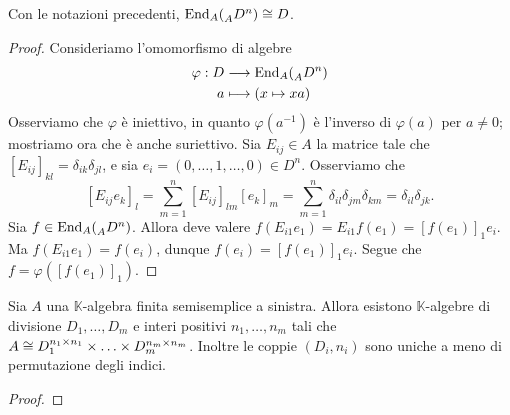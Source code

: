 \begin{proposition}
Con le notazioni precedenti, $\operatorname{End}_A(\prescript{}{A}{D}^n)\cong D$.
\end{proposition}
\begin{proof}
Consideriamo l'omomorfismo di algebre
\begin{align*}
\varphi:D&\longrightarrow\operatorname{End}_A(\prescript{}{A}{D}^n)\\
a&\longmapsto(x\mapsto xa)
\end{align*}
Osserviamo che $\varphi$ è iniettivo, in quanto $\varphi(a^{-1})$ è l'inverso di $\varphi(a)$ per $a\neq 0$; mostriamo ora che è anche suriettivo. Sia $E_{ij}\in A$ la matrice tale che $[E_{ij}]_{kl}=\delta_{ik}\delta_{jl}$, e sia $e_i=(0,\ldots,1,\ldots,0)\in D^n$. Osserviamo che
$$
[E_{ij}e_k]_l=\sum_{m=1}^{n}[E_{ij}]_{lm}[e_k]_m=\sum_{m=1}^{n}\delta_{il}\delta_{jm}\delta_{km}=\delta_{il}\delta_{jk}.
$$
Sia $f\in\operatorname{End}_A(\prescript{}{A}{D}^n)$. Allora deve valere $f(E_{i1}e_1)=E_{i1}f(e_1)=[f(e_1)]_1e_i$. Ma $f(E_{i1}e_1)=f(e_i)$, dunque $f(e_i)=[f(e_1)]_1e_i$. Segue che $f=\varphi([f(e_1)]_1)$.
\end{proof}


\begin{proposition}
Sia $A$ una $\mathbb{K}$-algebra finita semisemplice a sinistra. Allora esistono $\mathbb{K}$-algebre di divisione $D_1,\ldots,D_m$ e interi positivi $n_1,\ldots, n_m$ tali che $A\cong D_1^{n_1\times n_1}\times\ldots\times D_m^{n_m\times n_m}$. Inoltre le coppie $(D_i,n_i)$ sono uniche a meno di permutazione degli indici.
\end{proposition}
\begin{proof}

\end{proof}




